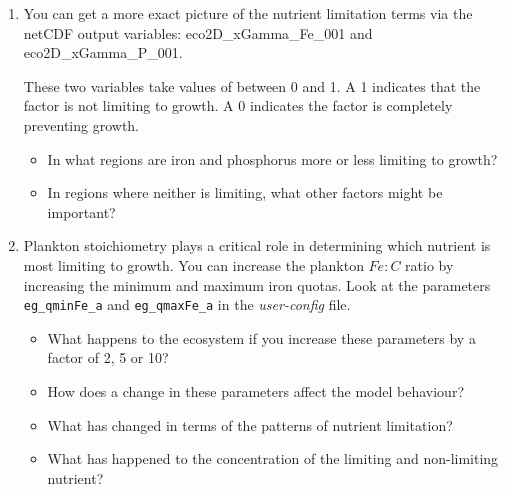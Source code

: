\begin{enumerate}[noitemsep]

\vspace{1mm}
\item You can get a more exact picture of the nutrient limitation terms via the netCDF output variables: \textsf{\footnotesize eco2D\_xGamma\_Fe\_001} and \textsf{\footnotesize eco2D\_xGamma\_P\_001}.

\vspace{1mm}
These two variables take values of between 0 and 1. A \textsf{\footnotesize 1} indicates that the factor is not limiting to growth. A \textsf{\footnotesize 0} indicates the factor is completely preventing growth.
\vspace{1mm}
\begin{itemize}
\item In what regions are iron and phosphorus more or less limiting to growth? \item In regions where neither is limiting, what other factors might be important?
\end{itemize}

\vspace{1mm}
\item  Plankton stoichiometry plays a critical role in determining which nutrient is most limiting to growth. You can increase the plankton \(Fe:C\) ratio by increasing the minimum and maximum iron quotas. Look at the parameters \texttt{eg\_qminFe\_a} and \texttt{eg\_qmaxFe\_a} in the \textit{user-config} file.

\vspace{1mm}
\begin{itemize}
\item What happens to the ecosystem if you increase these parameters by a factor of 2, 5 or 10?
\item How does a change in these parameters affect the model behaviour?
\item What has changed in terms of the patterns of nutrient limitation?
\item What has happened to the concentration of the limiting and non-limiting nutrient?
\end{itemize}


\end{enumerate}

